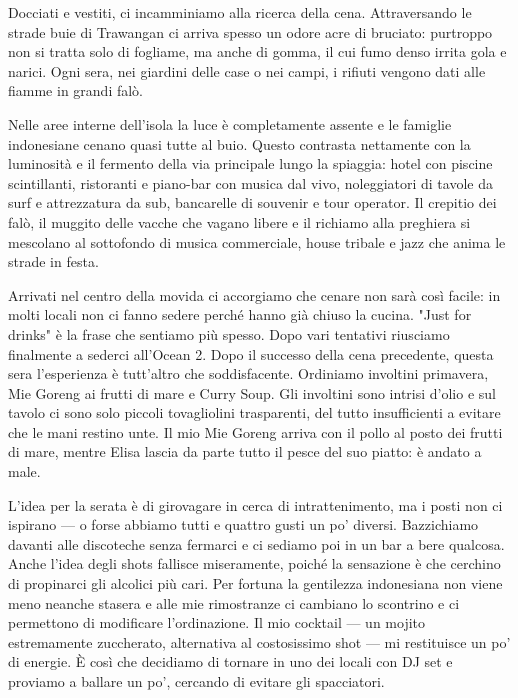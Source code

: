 Docciati e vestiti, ci incamminiamo alla ricerca della cena. Attraversando le strade buie di Trawangan ci arriva spesso un odore acre di bruciato: purtroppo non si tratta solo di fogliame, ma anche di gomma, il cui fumo denso irrita gola e narici. Ogni sera, nei giardini delle case o nei campi, i rifiuti vengono dati alle fiamme in grandi falò.

Nelle aree interne dell'isola la luce è completamente assente e le famiglie indonesiane cenano quasi tutte al buio. Questo contrasta nettamente con la luminosità e il fermento della via principale lungo la spiaggia: hotel con piscine scintillanti, ristoranti e piano-bar con musica dal vivo, noleggiatori di tavole da surf e attrezzatura da sub, bancarelle di souvenir e tour operator. Il crepitio dei falò, il muggito delle vacche che vagano libere e il richiamo alla preghiera si mescolano al sottofondo di musica commerciale, house tribale e jazz che anima le strade in festa.

Arrivati nel centro della movida ci accorgiamo che cenare non sarà così facile: in molti locali non ci fanno sedere perché hanno già chiuso la cucina. "Just for drinks" è la frase che sentiamo più spesso. Dopo vari tentativi riusciamo finalmente a sederci all'Ocean 2. Dopo il successo della cena precedente, questa sera l'esperienza è tutt'altro che soddisfacente. Ordiniamo involtini primavera, Mie Goreng ai frutti di mare e Curry Soup. Gli involtini sono intrisi d'olio e sul tavolo ci sono solo piccoli tovagliolini trasparenti, del tutto insufficienti a evitare che le mani restino unte. Il mio Mie Goreng arriva con il pollo al posto dei frutti di mare, mentre Elisa lascia da parte tutto il pesce del suo piatto: è andato a male.

L'idea per la serata è di girovagare in cerca di intrattenimento, ma i posti non ci ispirano — o forse abbiamo tutti e quattro gusti un po' diversi. Bazzichiamo davanti alle discoteche senza fermarci e ci sediamo poi in un bar a bere qualcosa. Anche l'idea degli shots fallisce miseramente, poiché la sensazione è che cerchino di propinarci gli alcolici più cari. Per fortuna la gentilezza indonesiana non viene meno neanche stasera e alle mie rimostranze ci cambiano lo scontrino e ci permettono di modificare l'ordinazione. Il mio cocktail — un mojito estremamente zuccherato, alternativa al costosissimo shot — mi restituisce un po' di energie. È così che decidiamo di tornare in uno dei locali con DJ set e proviamo a ballare un po', cercando di evitare gli spacciatori.

